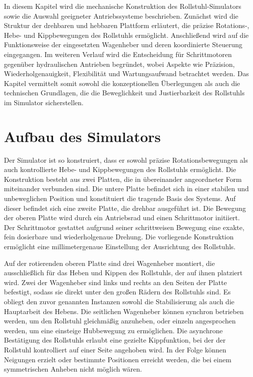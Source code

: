 
In diesem Kapitel wird die mechanische Konstruktion des Rollstuhl-Simulators sowie die 
Auswahl geeigneter Antriebssysteme beschrieben. Zunächst wird die Struktur der drehbaren 
und hebbaren Plattform erläutert, die präzise Rotations-, Hebe- und Kippbewegungen des 
Rollstuhls ermöglicht. Anschließend wird auf die Funktionsweise der eingesetzten Wagenheber 
und deren koordinierte Steuerung eingegangen. Im weiteren Verlauf wird die Entscheidung für 
Schrittmotoren gegenüber hydraulischen Antrieben begründet, wobei Aspekte wie Präzision, 
Wiederholgenauigkeit, Flexibilität und Wartungsaufwand betrachtet werden. Das Kapitel 
vermittelt somit sowohl die konzeptionellen Überlegungen als auch die technischen 
Grundlagen, die die Beweglichkeit und Justierbarkeit des Rollstuhls im Simulator 
sicherstellen.

\section{Aufbau des Simulators}

Der Simulator ist so konstruiert, dass er sowohl präzise Rotationsbewegungen als auch 
kontrollierte Hebe- und Kippbewegungen des Rollstuhls ermöglicht. Die Konstruktion besteht aus zwei Platten, die in übereinander angeordneter Form miteinander verbunden sind. Die untere Platte befindet sich in einer stabilen und unbeweglichen Position und konstituiert die tragende Basis des Systems. Auf dieser befindet sich eine zweite Platte, die drehbar ausgeführt ist. Die Bewegung der oberen Platte wird durch ein Antriebsrad und einen Schrittmotor initiiert. Der Schrittmotor gestattet aufgrund seiner schrittweisen Bewegung eine exakte, fein dosierbare und wiederholgenaue Drehung. Die vorliegende Konstruktion ermöglicht eine millimetergenaue Einstellung der Ausrichtung des Rollstuhls. 

Auf der rotierenden oberen Platte sind drei Wagenheber montiert, die ausschließlich 
für das Heben und Kippen des Rollstuhls, der auf ihnen platziert wird. Zwei der 
Wagenheber sind links und rechts an den Seiten der Platte befestigt, sodass sie direkt 
unter den großen Rädern des Rollstuhls sind. Es obliegt den zuvor genannten Instanzen 
sowohl die Stabilisierung als auch die Hauptarbeit des Hebens. Die seitlichen Wagenheber können synchron betrieben werden, um den Rollstuhl gleichmäßig anzuheben, oder einzeln angesprochen werden, um eine einsteige Hubbewegung zu ermöglichen. Die asynchrone Bestätigung des Rollstuhls erlaubt eine gezielte Kippfunktion, bei der der Rollstuhl kontrolliert auf einer Seite angehoben wird. In der Folge können Neigungen erzielt oder bestimmte Positionen erreicht werden, die bei einem symmetrischen Anheben nicht möglich wären.


